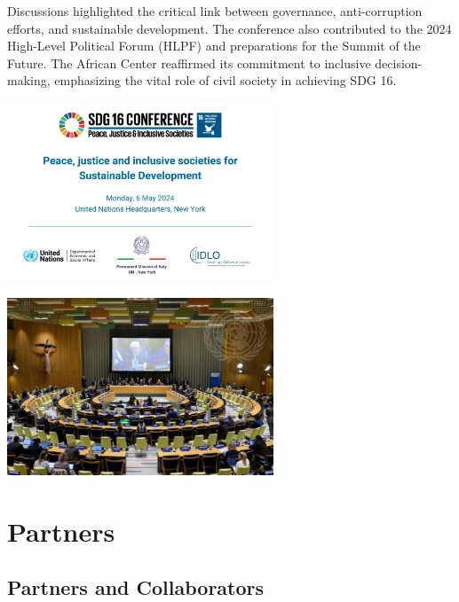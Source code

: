 \documentclass[
  letterpaper,
  DIV=11,
  numbers=noendperiod]{scrreprt}
\begin{document}
Discussions highlighted the critical link between governance,
anti-corruption efforts, and sustainable development. The conference
also contributed to the 2024 High-Level Political Forum (HLPF) and
preparations for the Summit of the Future. The African Center reaffirmed
its commitment to inclusive decision-making, emphasizing the vital role
of civil society in achieving SDG 16.

\begin{center}
\includegraphics[width=3.125in,height=\textheight,keepaspectratio]{images/implement/01_sdgs.png}
\end{center}

\begin{center}
\includegraphics[width=3.125in,height=\textheight,keepaspectratio]{images/implement/01_1_sdgs.png}
\end{center}

\part{Partners}

\chapter*{Partners and Collaborators}\label{partners-and-collaborators}

\end{document}
